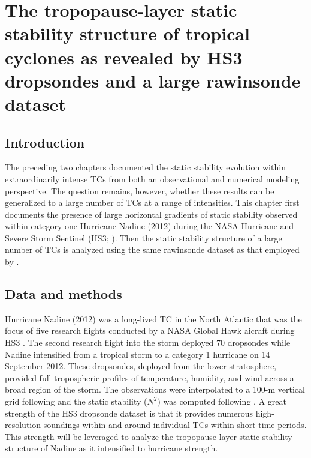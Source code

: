  
\chapter{The tropopause-layer static stability structure of tropical cyclones as revealed by HS3 dropsondes and a large rawinsonde dataset}
\resetfootnote %

\section{Introduction}

The preceding two chapters documented the static stability evolution within extraordinarily intense TCs from both an observational and numerical modeling perspective.
The question remains, however, whether these results can be generalized to a large number of TCs at a range of intensities.
This chapter first documents the presence of large horizontal gradients of static stability observed within category one Hurricane Nadine (2012) during the NASA Hurricane and Severe Storm Sentinel (HS3; \citeauthor{Braunetal2016} \citeyear{Braunetal2016}).
Then the static stability structure of a large number of TCs is analyzed using the same rawinsonde dataset as that employed by \cite{DuranMolinari2016}.

\section{Data and methods}
Hurricane Nadine (2012) was a long-lived TC in the North Atlantic that was the focus of five research flights conducted by a NASA Global Hawk aicraft during HS3 \citep{Braunetal2016}.
The second research flight into the storm deployed 70 dropsondes \cite{Young2012} while Nadine intensified from a tropical storm to a category 1 hurricane \cite{Brown2013} on 14 September 2012.
These dropsondes, deployed from the lower stratosphere, provided full-tropospheric profiles of temperature, humidity, and wind across a broad region of the storm.
The observations were interpolated to a 100-m vertical grid following \cite{MolinariVolarro2012} and the static stability ($N^2$) was computed following \cite{DuranMolinari2018}.
A great strength of the HS3 dropsonde dataset is that it provides numerous high-resolution soundings within and around individual TCs within short time periods.
This strength will be leveraged to analyze the tropopause-layer static stability structure of Nadine as it intensified to hurricane strength.


